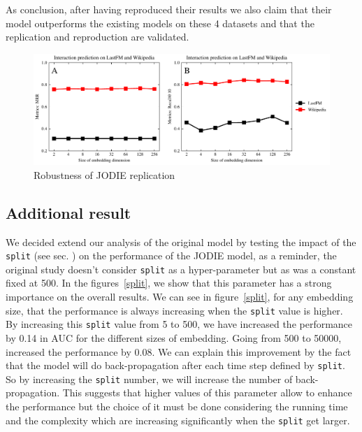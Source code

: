 As conclusion, after having reproduced their results we also claim that their model outperforms the existing models on these 4 datasets and that the replication and reproduction are validated.




\begin{figure}[htbp]
    \centering
    \includegraphics[width = \textwidth]{image/lastFM-wiki.pdf}
    \caption{Robustness of JODIE replication}
    \label{emb-size}
\end{figure}

\subsection*{Additional result}

We decided extend our analysis of the original model by testing the impact of the \texttt{split} (see sec. ) on the performance of the JODIE model, as a reminder, the original study doesn't consider \texttt{split} as a hyper-parameter but as was a constant fixed at 500. In the figures~\ref{split}, we show that this parameter has a strong importance on the overall results. We can see in figure~\ref{split}, for any embedding size, that the performance is always increasing when the \texttt{split} value is higher. By increasing this \texttt{split} value from 5 to 500, we have increased the performance by 0.14 in AUC for the different sizes of embedding. Going from 500 to 50000, increased the performance by 0.08. We can explain this improvement by the fact that the model will do back-propagation after each time step defined by \texttt{split}. So by increasing the \texttt{split} number, we will increase the number of back-propagation. This suggests that higher values of this parameter allow to enhance the performance but the choice of it must be done considering the running time and the complexity which are increasing significantly when the \texttt{split} get larger.

